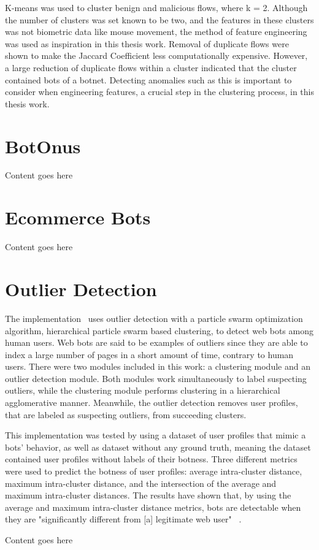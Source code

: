 K-means was used to cluster benign and malicious flows, where k = 2.
Although the number of clusters was set known to be two, and the features in these clusters was not biometric data like mouse movement, the method of feature engineering was used as inspiration in this thesis work.
Removal of duplicate flows were shown to make the Jaccard Coefficient less computationally expensive.
However, a large reduction of duplicate flows within a cluster indicated that the cluster contained bots of a botnet.
Detecting anomalies such as this is important to consider when engineering features, a crucial step in the clustering process, in this thesis work.

\section{BotOnus}\label{sec:botonus}
Content goes here~\cite{botonus}

\section{Ecommerce Bots}\label{sec:ecommerce-bots}
Content goes here~\cite{ROVETTA2020102577}

\section{Outlier Detection}\label{sec:outlier-detection}
The implementation~\cite{particle_swarm} uses outlier detection with a particle swarm optimization algorithm, hierarchical particle swarm based clustering, to detect web bots among human users.
Web bots are said to be examples of outliers since they are able to index a large number of pages in a short amount of time, contrary to human users.
There were two modules included in this work: a clustering module and an outlier detection module.
Both modules work simultaneously to label suspecting outliers, while the clustering module performs clustering in a hierarchical agglomerative manner.
Meanwhile, the outlier detection removes user profiles, that are labeled as suspecting outliers, from succeeding clusters.

This implementation was tested by using a dataset of user profiles that mimic a bots' behavior, as well as dataset without any ground truth, meaning the dataset contained user profiles without labels of their botness.
Three different metrics were used to predict the botness of user profiles: average intra-cluster distance, maximum intra-cluster distance, and the intersection of the average and maximum intra-cluster distances.
The results have shown that, by using the average and maximum intra-cluster distance metrics, bots are detectable when they are "significantly different from [a] legitimate web user" ~\cite{particle_swarm}.

Content goes here~\cite{optimized_outlier_bot_detection}
